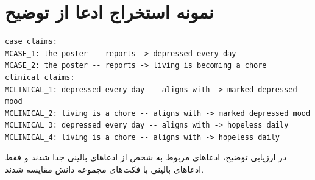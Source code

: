 \section{نمونه استخراج ادعا از توضیح }
\begin{latin}\scriptsize\begin{verbatim}
case claims:
MCASE_1: the poster -- reports -> depressed every day
MCASE_2: the poster -- reports -> living is becoming a chore
clinical claims:
MCLINICAL_1: depressed every day -- aligns with -> marked depressed mood
MCLINICAL_2: living is a chore -- aligns with -> marked depressed mood
MCLINICAL_3: depressed every day -- aligns with -> hopeless daily
MCLINICAL_4: living is a chore -- aligns with -> hopeless daily
\end{verbatim}
\end{latin}
در ارزیابی توضیح، ادعاهای مربوط به شخص از ادعاهای بالینی جدا شدند و فقط ادعاهای بالینی با فکت‌های مجموعه دانش مقایسه شدند.
